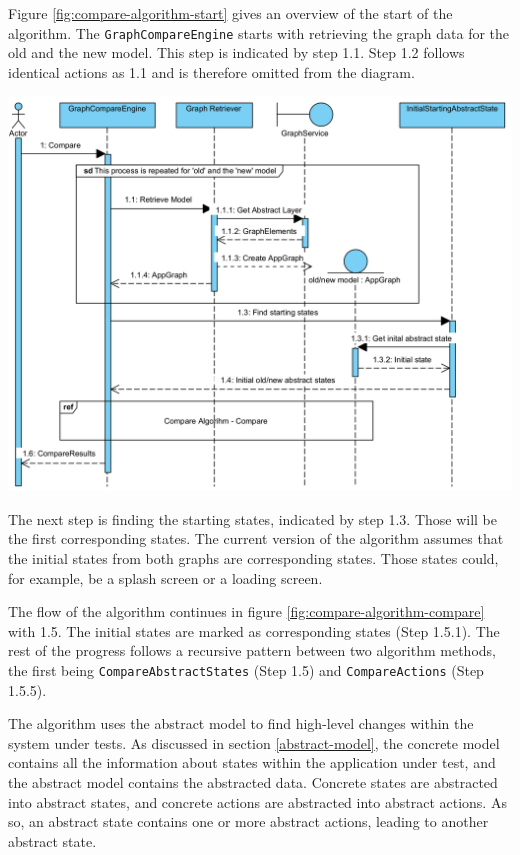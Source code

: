 Figure \ref{fig:compare-algorithm-start} gives an overview of the start of the algorithm. The \verb|GraphCompareEngine| starts with retrieving the graph data for the old and the new model. This step is indicated by step 1.1. Step 1.2 follows identical actions as 1.1 and is therefore omitted from the diagram.
\newpage

\begingroup
\captionsetup{type=figure}
\includegraphics[scale=0.9]{content/5-Results/Images/Compare-algorithm-start.png}
\label{fig:compare-algorithm-start}
\endgroup

The next step is finding the starting states, indicated by step 1.3. Those will be the first corresponding states. The current version of the algorithm assumes that the initial states from both graphs are corresponding states. Those states could, for example, be a splash screen or a loading screen.

The flow of the algorithm continues in figure \ref{fig:compare-algorithm-compare} with 1.5. The initial states are marked as corresponding states (Step 1.5.1). The rest of the progress follows a recursive pattern between two algorithm methods, the first being \verb|CompareAbstractStates| (Step 1.5) and \verb|CompareActions| (Step 1.5.5).

The algorithm uses the abstract model to find high-level changes within the system under tests. As discussed in section \ref{abstract-model}, the concrete model contains all the information about states within the application under test, and the abstract model contains the abstracted data. Concrete states are abstracted into abstract states, and concrete actions are abstracted into abstract actions. As so, an abstract state contains one or more abstract actions, leading to another abstract state.
 
